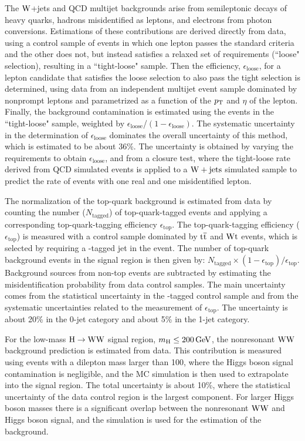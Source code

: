 \documentclass[11pt,twoside,a4paper,cmspaper,final,collab]{cms-tdr}
\begin{document}
The $\mathrm{W}$+jets and QCD multijet backgrounds arise from semileptonic
decays of heavy quarks, ha\-drons misidentified as leptons, and electrons
from photon conversions. Estimations of these contributions are derived
directly from data, using a control sample of events in which one lepton
passes the standard criteria and the other does not, but instead satisfies a
relaxed set of requirements (``loose" selection), resulting in a
``tight-loose" sample.
Then the efficiency, $\epsilon_\text{loose}$, for a lepton candidate that satisfies the loose
selection to also pass the tight selection is determined, using data from an
independent multijet event sample dominated by nonprompt leptons and
parametrized as a function of the $p_{\mathrm{T}}$ and $\eta$ of the lepton. Finally, the background
contamination is estimated using the events in the ``tight-loose"
sample, weighted by \mbox{$\epsilon_\text{loose}$/$(1-\epsilon_\text{loose})$}. The
systematic uncertainty in the  determination of $\epsilon_\text{loose}$
dominates the overall uncertainty of this method, which is estimated
to be about 36\%. The uncertainty is obtained by varying the requirements to
obtain $\epsilon_\text{loose}$, and from a closure test, where the tight-loose rate derived
from QCD simulated events is applied to a $\mathrm{W}+\text{jets}$ simulated sample to predict the rate of
events with one real and one misidentified lepton.

The normalization of the top-quark background is estimated from data
by counting the number ($N_\text{tagged}$) of top-quark-tagged events and applying a
corresponding top-quark-tagging efficiency $\epsilon_\text{top}$. The top-quark-tagging efficiency
($\epsilon_\text{top}$) is measured with a control sample dominated by
$\mathrm{t}\overline{\mathrm{t}}$ and $\mathrm{W}\mathrm{t}$ events, which is selected by requiring a \cPqb-tagged jet in the event.
The number of top-quark background events in the signal region is then given
by: $N_\text{tagged} \times (1-\epsilon_\text{top})/\epsilon_\text{top}$. Background
sources from non-top events are subtracted by estimating the misidentification
probability from data control samples. The main uncertainty comes from the statistical
uncertainty in the \cPqb-tagged control sample and from the systematic uncertainties related to
the measurement of $\epsilon_\text{top}$. The uncertainty is about
20\% in the 0-jet category and about 5\% in the 1-jet category.

For the low-mass $\mathrm{H} \to \mathrm{W}\mathrm{W}$ signal region, $m_{\mathrm{H}} \leq 200\,\text{Ge\hspace{-.08em}V}$,
the nonresonant $\mathrm{W}\mathrm{W}$ background prediction is estimated from data. This contribution
is measured using events with a dilepton mass larger than 100\GeV,
where the Higgs boson signal contamination is negligible, and the MC simulation
is then used to extrapolate into the signal region. The total uncertainty is
about 10\%, where the statistical uncertainty of the data control region is the
largest component.
For larger Higgs boson masses there is a significant overlap between the
nonresonant $\mathrm{W}\mathrm{W}$ and Higgs boson signal, and the simulation is
used for the estimation of the background.
\end{document}
